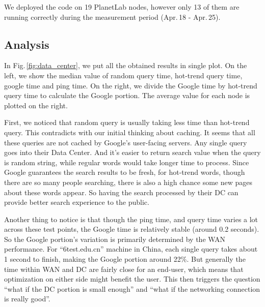 We deployed the code on 19 PlanetLab nodes, however only 13 of them are running correctly during the measurement period (Apr.\,18 - Apr.\,25).

\subsection{Analysis}
\label{sec:analysis}

In Fig.\,\ref{fig:data_center}, we put all the obtained results in single plot. On the left, we show the median value of random query time, hot-trend query time, google time and ping time. On the right, we divide the Google time by hot-trend query time to calculate the Google portion. The average value for each node is plotted on the right.

First, we noticed that random query is usually taking less time than hot-trend query. This contradicts with our initial thinking about caching. It seems that all these queries are not cached by Google's user-facing servers. Any single query goes into their Data Center. And it's easier to return search value when the query is random string, while regular words would take longer time to process. Since Google guarantees the search results to be fresh, for hot-trend words, though there are so many people searching, there is also a high chance some new pages about these words appear. So having the search processed by their DC can provide better search experience to the public.

Another thing to notice is that though the ping time, and query time varies a lot across these test points, the Google time is relatively stable (around 0.2 seconds). So the Google portion's variation is primarily determined by the WAN performance. For ``6test.edu.cn'' machine in China, each single query takes about 1 second to finish, making the Google portion around 22\%. But generally the time within WAN and DC are fairly close for an end-user, which means that optimization on either side might benefit the user. This then triggers the question ``what if the DC portion is small enough'' and ``what if the networking connection is really good''.


